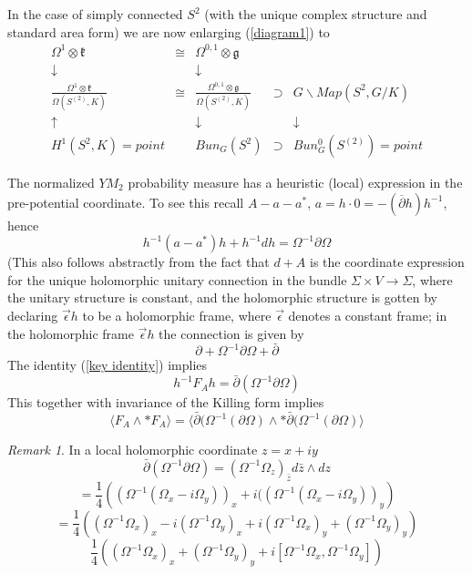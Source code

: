 \documentclass{amsart}
\theoremstyle{conjecture}
\theoremstyle{definition}
\theoremstyle{question}
\theoremstyle{questions}
\theoremstyle{remark}
\newtheorem*{remark}{Remark}
\theoremstyle{remarks}
\theoremstyle{example}
\numberwithin{equation}{section}
\begin{document}
In the case of simply connected $S^2$ (with the unique complex structure and standard area form) we are now enlarging (\ref{diagram1}) to
$$\begin{matrix} \Omega^1\otimes \mathfrak k &\cong & \Omega^{0,1}\otimes \mathfrak g & & \\
\downarrow & &\downarrow & & \\
\frac{\Omega^1\otimes \mathfrak k}{\Omega(S^{(2)},K)} & \cong&  \frac{\Omega^{0,1}\otimes \mathfrak g}{\Omega(S^{(2)},K)} & \supset &  G\backslash Map(S^2,G/K)\\ 
\uparrow & &\downarrow & &\downarrow  \\ 
H^1(S^2,K)=point & &   Bun_G(S^2) & \supset & Bun_G^0(S^{(2)})=point \end{matrix} $$

The normalized 
$YM_2$ probability measure has a heuristic (local) expression in the pre-potential coordinate. To see this recall
$A-a-a^*$, $a=h\cdot 0=-(\overline{\partial} h)h^{-1}$, hence
\begin{equation}\label{key identity}h^{-1}(a-a^{*})h+h^{-1}dh=\Omega^{-1}\partial\Omega \end{equation}
(This also follows abstractly from the fact that 
$d+A$ is the coordinate expression for the unique holomorphic 
unitary connection in the bundle $\Sigma\times V\to\Sigma$, where the unitary 
structure is constant, and the holomorphic structure is gotten 
by declaring $\vec{\epsilon }h$ to be a holomorphic frame, where $
\vec{\epsilon}$ denotes a 
constant frame; in the holomorphic frame $\vec{\epsilon }h$ the connection is 
given by 
$$\partial +\Omega^{-1}\partial\Omega +\bar{\partial }$$
The identity (\ref{key identity}) implies 
$$h^{-1}F_A h=\bar{\partial }(\Omega^{-1}\partial\Omega )$$
This together with invariance of the Killing form implies
\begin{equation}\label{key identity 2}\langle F_A\wedge *F_A\rangle =\langle\bar{\partial }(\Omega^{-
1}(\partial\Omega )\wedge *\bar{\partial }(\Omega^{-1}(\partial\Omega 
)\rangle \end{equation}

\begin{remark} In a local holomorphic coordinate $z=x+iy$
$$\bar{\partial }(\Omega^{-1}\partial\Omega )=(\Omega^{-1}\Omega_z )_{\bar{z}}d\bar{z}\wedge dz$$
$$=\frac 14 \left( (\Omega^{-1}(\Omega_x-i\Omega_y))_x+i( (\Omega^{-1}(\Omega_x-i\Omega_y))_y\right)$$
$$=\frac 14 \left( (\Omega^{-1}\Omega_x)_x-i(\Omega^{-1}\Omega_y)_x+i(\Omega^{-1}\Omega_x)_y+(\Omega^{-1}\Omega_y)_y\right)$$
$$\frac 14 \left( (\Omega^{-1}\Omega_x)_x+(\Omega^{-1}\Omega_y)_y+i[\Omega^{-1}\Omega_x,\Omega^{-1}\Omega_y]\right) $$


\end{remark}
\end{document}

